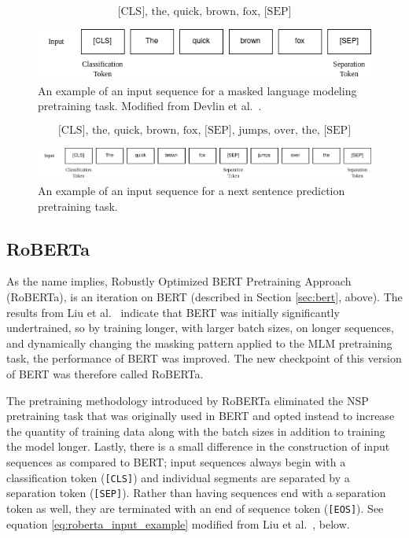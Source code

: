 \documentclass[12pt]{article}
\begin{document}
\begin{equation}\label{eq:bert_mlm_input_example}
    \mbox{[CLS], the, quick, brown, fox, [SEP]}
\end{equation}

\begin{figure}[!t]
    \includegraphics[width=\linewidth]{figures/BERT_MLM_input.png}
    \caption{An example of an input sequence for a masked language modeling pretraining task. Modified from Devlin et al.~\cite{devlin_bert_2019}.}
    \label{fig:bert_mlm_input_example}
\end{figure}

\begin{equation}\label{eq:bert_nsp_input_example}
    \mbox{[CLS], the, quick, brown, fox, [SEP], jumps, over, the, [SEP]}
\end{equation}

\begin{figure}[!t]
    \includegraphics[width=\linewidth]{figures/BERT_NSP_input.png}
    \caption{An example of an input sequence for a next sentence prediction pretraining task.}
    \label{fig:bert_nsp_input_example}
\end{figure}

\subsection{RoBERTa}\label{sec:roberta}
As the name implies, Robustly Optimized BERT Pretraining Approach (RoBERTa), is an iteration on BERT (described in Section \ref{sec:bert}, above).
The results from Liu et al.~\cite{liu_roberta_2019} indicate that BERT was initially significantly undertrained, so by training longer, with larger
batch sizes, on longer sequences, and dynamically changing the masking pattern applied to the MLM pretraining task, the performance of BERT was
improved. The new checkpoint of this version of BERT was therefore called RoBERTa.

The pretraining methodology introduced by RoBERTa eliminated the NSP pretraining task that was originally used in BERT and opted instead to increase
the quantity of training data along with the batch sizes in addition to training the model longer. Lastly, there is a small difference in the
construction of input sequences as compared to BERT; input sequences always begin with a classification token (\lstinline|[CLS]|) and individual
segments are separated by a separation token (\lstinline|[SEP]|). Rather than having sequences end with a separation token as well, they are
terminated with an end of sequence token (\lstinline|[EOS]|). See equation \ref{eq:roberta_input_example} modified from Liu et
al.~\cite{liu_roberta_2019}, below.
\end{document}
